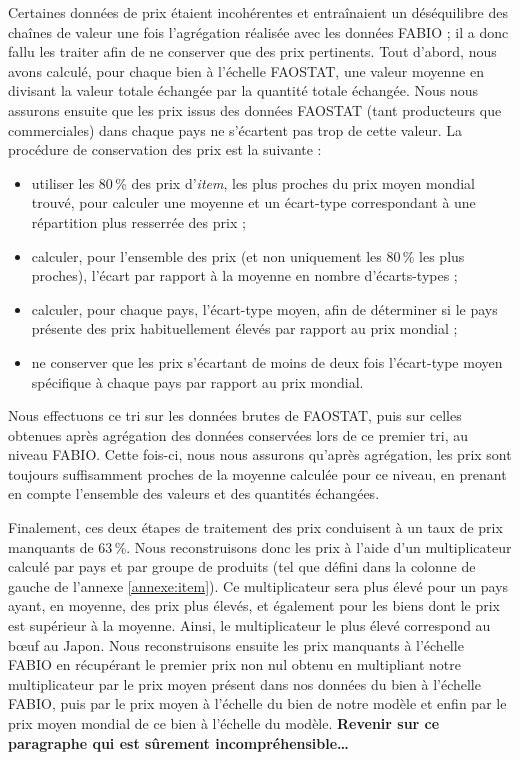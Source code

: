 Certaines données de prix étaient incohérentes et entraînaient un déséquilibre des chaînes de valeur une fois l'agrégation réalisée avec les données FABIO ; il a donc fallu les traiter afin de ne conserver que des prix pertinents. Tout d'abord, nous avons calculé, pour chaque bien à l'échelle FAOSTAT, une valeur moyenne en divisant la valeur totale échangée par la quantité totale échangée. Nous nous assurons ensuite que les prix issus des données FAOSTAT (tant producteurs que commerciales) dans chaque pays ne s'écartent pas trop de cette valeur. La procédure de conservation des prix est la suivante :
\begin{itemize}
    \item utiliser les 80\,\% des prix d'\textit{item}, les plus proches du prix moyen mondial trouvé, pour calculer une moyenne et un écart-type correspondant à une répartition plus resserrée des prix ;
    \item calculer, pour l'ensemble des prix (et non uniquement les 80\,\% les plus proches), l'écart par rapport à la moyenne en nombre d’écarts-types ;
    \item calculer, pour chaque pays, l'écart-type moyen, afin de déterminer si le pays présente des prix habituellement élevés par rapport au prix mondial ;
    \item ne conserver que les prix s'écartant de moins de deux fois l'écart-type moyen spécifique à chaque pays par rapport au prix mondial.
\end{itemize}
Nous effectuons ce tri sur les données brutes de FAOSTAT, puis sur celles obtenues après agrégation des données conservées lors de ce premier tri, au niveau FABIO. Cette fois-ci, nous nous assurons qu'après agrégation, les prix sont toujours suffisamment proches de la moyenne calculée pour ce niveau, en prenant en compte l'ensemble des valeurs et des quantités échangées.

Finalement, ces deux étapes de traitement des prix conduisent à un taux de prix manquants de 63\,\%. Nous reconstruisons donc les prix à l'aide d'un multiplicateur calculé par pays et par groupe de produits (tel que défini dans la colonne de gauche de l'annexe \ref{annexe:item}). Ce multiplicateur sera plus élevé pour un pays ayant, en moyenne, des prix plus élevés, et également pour les biens dont le prix est supérieur à la moyenne. Ainsi, le multiplicateur le plus élevé correspond au bœuf au Japon. Nous reconstruisons ensuite les prix manquants à l'échelle FABIO en récupérant le premier prix non nul obtenu en multipliant notre multiplicateur par le prix moyen présent dans nos données du bien à l'échelle FABIO, puis par le prix moyen à l'échelle du bien de notre modèle et enfin par le prix moyen mondial de ce bien à l'échelle du modèle. \textbf{Revenir sur ce paragraphe qui est sûrement incompréhensible\dots}


